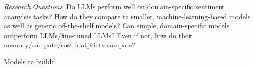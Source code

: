 

\emph{Research Questions}: Do LLMs perform well on domain-specific sentiment ananylsis tasks? How do they compare to smaller, machine-learning-based models as well as generic off-the-shelf models? Can simple, domain-specific models outperform LLMs/fine-tuned LLMs? Even if not, how do their memory/compute/cost footprints compare? 

Models to build:











